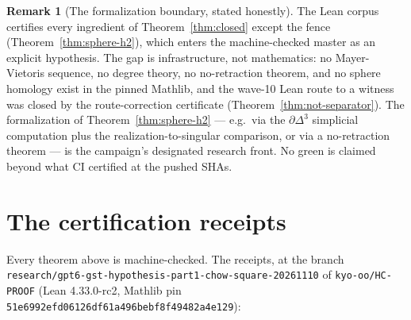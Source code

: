 \documentclass[11pt,a4paper]{article}
\theoremstyle{plain}
\theoremstyle{definition}
\newtheorem{remark}[theorem]{Remark}
\begin{document}
\begin{remark}[The formalization boundary, stated honestly]
The Lean corpus certifies every ingredient of
Theorem~\ref{thm:closed} except the fence
(Theorem~\ref{thm:sphere-h2}), which enters the machine-checked
master as an explicit hypothesis.  The gap is infrastructure, not
mathematics: no Mayer-Vietoris sequence, no degree theory, no
no-retraction theorem, and no sphere homology exist in the pinned
Mathlib, and the wave-10 Lean route to a witness was closed by the
route-correction certificate
(Theorem~\ref{thm:not-separator}).  The formalization of
Theorem~\ref{thm:sphere-h2} --- e.g.\ via the $\partial\Delta^3$
simplicial computation plus the realization-to-singular comparison,
or via a no-retraction theorem --- is the campaign's designated
research front.  No green is claimed beyond what CI certified at the
pushed SHAs.
\end{remark}

\section{The certification receipts}\label{sec:certification}

Every theorem above is machine-checked.  The receipts, at the branch
\texttt{research/gpt6-gst-hypothesis-part1-chow-square-20261110} of
\texttt{kyo-oo/HC-PROOF} (Lean 4.33.0-rc2, Mathlib pin
\texttt{51e6992efd06126df61a496bebf8f49482a4e129}):
\end{document}
